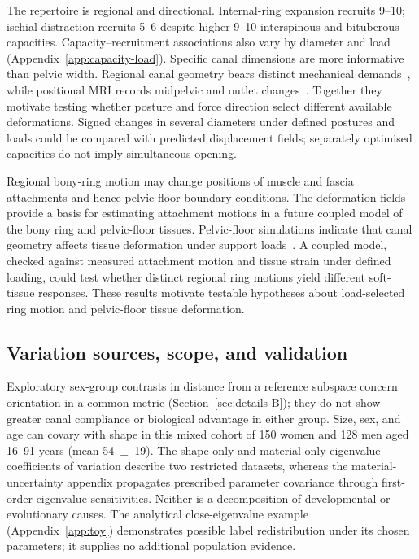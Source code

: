 \documentclass[pdflatex,sn-basic]{sn-jnl}
\begin{document}
The repertoire is regional and directional. Internal-ring expansion recruits 9--10; ischial distraction recruits 5--6 despite higher 9--10 interspinous and bituberous capacities. Capacity--recruitment associations also vary by diameter and load (Appendix~\ref{app:capacity-load}). Specific canal dimensions are more informative than pelvic width. Regional canal geometry bears distinct mechanical demands~\citep{StansfieldCanal2021}, while positional MRI records midpelvic and outlet changes~\citep{Reitter2014}. Together they motivate testing whether posture and force direction select different available deformations. Signed changes in several diameters under defined postures and loads could be compared with predicted displacement fields; separately optimised capacities do not imply simultaneous opening.

Regional bony-ring motion may change positions of muscle and fascia attachments and hence pelvic-floor boundary conditions. The deformation fields provide a basis for estimating attachment motions in a future coupled model of the bony ring and pelvic-floor tissues. Pelvic-floor simulations indicate that canal geometry affects tissue deformation under support loads~\citep{StansfieldFloor2021,StansfieldCanal2021}. A coupled model, checked against measured attachment motion and tissue strain under defined loading, could test whether distinct regional ring motions yield different soft-tissue responses. These results motivate testable hypotheses about load-selected ring motion and pelvic-floor tissue deformation.

\subsection{Variation sources, scope, and validation}
Exploratory sex-group contrasts in distance from a reference subspace concern orientation in a common metric (Section~\ref{sec:details-B}); they do not show greater canal compliance or biological advantage in either group. Size, sex, and age can covary with shape in this mixed cohort of 150 women and 128 men aged 16--91 years (mean 54~$\pm$~19). The shape-only and material-only eigenvalue coefficients of variation describe two restricted datasets, whereas the material-uncertainty appendix propagates prescribed parameter covariance through first-order eigenvalue sensitivities. Neither is a decomposition of developmental or evolutionary causes. The analytical close-eigenvalue example (Appendix~\ref{app:toy}) demonstrates possible label redistribution under its chosen parameters; it supplies no additional population evidence.
\end{document}
